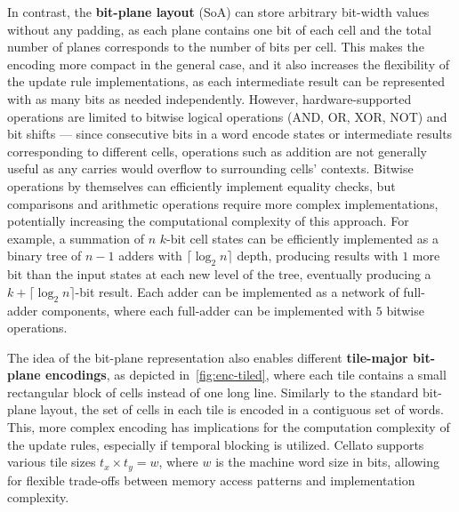 In contrast, the \textbf{bit-plane layout} (SoA) can store arbitrary bit-width values without any padding, as each plane contains one bit of each cell and the total number of planes corresponds to the number of bits per cell. This makes the encoding more compact in the general case, and it also increases the flexibility of the update rule implementations, as each intermediate result can be represented with as many bits as needed independently. However, hardware-supported operations are limited to bitwise logical operations (AND, OR, XOR, NOT) and bit shifts --- since consecutive bits in a word encode states or intermediate results corresponding to different cells, operations such as addition are not generally useful as any carries would overflow to surrounding cells' contexts. Bitwise operations by themselves can efficiently implement equality checks, but comparisons and arithmetic operations require more complex implementations, potentially increasing the computational complexity of this approach. For example, a summation of $n$ $k$-bit cell states can be efficiently implemented as a binary tree of $n-1$ adders with $\lceil \log_2 n \rceil$ depth, producing results with $1$ more bit than the input states at each new level of the tree, eventually producing a $k + \lceil \log_2 n \rceil$-bit result. Each adder can be implemented as a network of full-adder components, where each full-adder can be implemented with $5$ bitwise operations.

The idea of the bit-plane representation also enables different \textbf{tile-major bit-plane encodings}, as depicted in~\cref{fig:enc-tiled}, where each tile contains a small rectangular block of cells instead of one long line. Similarly to the standard bit-plane layout, the set of cells in each tile is encoded in a contiguous set of words. This, more complex encoding has implications for the computation complexity of the update rules, especially if temporal blocking is utilized. Cellato supports various tile sizes $t_x \times t_y = w$, where $w$ is the machine word size in bits, allowing for flexible trade-offs between memory access patterns and implementation complexity.

